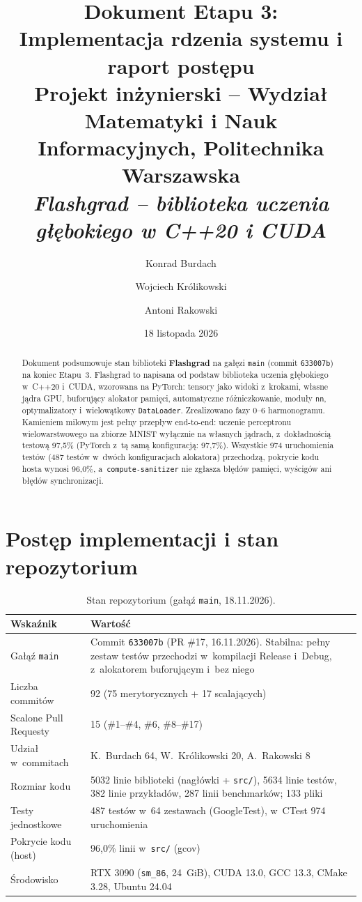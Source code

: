 \documentclass[11pt,a4paper]{article}
\title{\textbf{Dokument Etapu 3:\\ Implementacja rdzenia systemu i raport postępu}\\[4pt]
  \large Projekt inżynierski -- Wydział Matematyki i Nauk Informacyjnych, Politechnika Warszawska\\[2pt]
  \normalsize \textit{Flashgrad -- biblioteka uczenia głębokiego w C++20 i CUDA}}
\author{Konrad Burdach \and Wojciech Królikowski \and Antoni Rakowski}
\date{18 listopada 2026}
\begin{document}
\maketitle
\thispagestyle{fancy}

\begin{abstract}
\noindent
Dokument podsumowuje stan biblioteki \textbf{Flashgrad} na gałęzi \texttt{main}
(commit \texttt{633007b}) na koniec Etapu~3. Flashgrad to napisana od podstaw biblioteka
uczenia głębokiego w~C++20 i~CUDA, wzorowana na PyTorch: tensory jako widoki z~krokami,
własne jądra GPU, buforujący alokator pamięci, automatyczne różniczkowanie, moduły
\texttt{nn}, optymalizatory i~wielowątkowy \texttt{DataLoader}. Zrealizowano fazy 0--6
harmonogramu. Kamieniem milowym jest pełny przepływ end-to-end: uczenie perceptronu
wielowarstwowego na zbiorze MNIST wyłącznie na własnych jądrach, z~dokładnością testową
97,5\% (PyTorch z~tą samą konfiguracją: 97,7\%). Wszystkie 974 uruchomienia testów
(487 testów w~dwóch konfiguracjach alokatora) przechodzą, pokrycie kodu hosta wynosi
96,0\%, a~\texttt{compute-sanitizer} nie zgłasza błędów pamięci, wyścigów ani błędów
synchronizacji.
\end{abstract}

\tableofcontents
\newpage

\section{Postęp implementacji i stan repozytorium}

\begin{table}[H]
\centering
\caption{Stan repozytorium (gałąź \texttt{main}, 18.11.2026).}
\label{tab:repo}
\begin{tabularx}{\textwidth}{@{}lX@{}}
\toprule
\textbf{Wskaźnik} & \textbf{Wartość} \\
\midrule
Gałąź \texttt{main} & Commit \texttt{633007b} (PR \#17, 16.11.2026). Stabilna: pełny zestaw testów
  przechodzi w~kompilacji Release i~Debug, z~alokatorem buforującym i~bez niego \\
Liczba commitów & 92 (75 merytorycznych + 17 scalających) \\
Scalone Pull Requesty & 15 (\#1--\#4, \#6, \#8--\#17) \\
Udział w~commitach & K.~Burdach 64, W.~Królikowski 20, A.~Rakowski 8 \\
Rozmiar kodu & 5032 linie biblioteki (nagłówki + \texttt{src/}), 5634 linie testów,
  382 linie przykładów, 287 linii benchmarków; 133 pliki \\
Testy jednostkowe & 487 testów w~64 zestawach (GoogleTest), w~CTest 974 uruchomienia \\
Pokrycie kodu (host) & 96,0\% linii w~\texttt{src/} (gcov) \\
Środowisko & RTX 3090 (\texttt{sm\_86}, 24~GiB), CUDA 13.0, GCC 13.3, CMake 3.28, Ubuntu 24.04 \\
\bottomrule
\end{tabularx}
\end{table}
\end{document}
